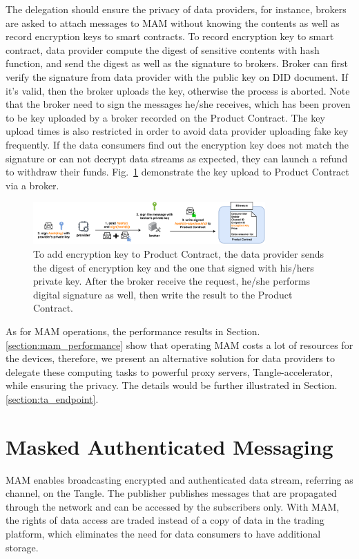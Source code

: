 \documentclass[conference]{IEEEtran}
\begin{document}
The delegation should ensure the privacy of data providers, for instance, brokers are asked to attach messages to MAM without knowing the contents as well as record encryption keys to smart contracts. To record encryption key to smart contract, data provider compute the digest of sensitive contents with hash function, and send the digest as well as the signature to brokers. Broker can first verify the signature from data provider with the public key on DID document. If it's valid, then the broker uploads the key, otherwise the process is aborted. Note that the broker need to sign the messages he/she receives, which has been proven to be key uploaded by a broker recorded on the Product Contract. The key upload times is also restricted in order to avoid data provider uploading fake key frequently. If the data consumers find out the encryption key does not match the signature or can not decrypt data streams as expected, they can launch a refund to withdraw their funds. Fig.~\ref{fig:key_upload} demonstrate the key upload to Product Contract via a broker. 

\begin{figure}[h]
    \centering
    \includegraphics[width=3.5in]{key_upload}
    \caption{To add encryption key to Product Contract, the data provider sends the digest of encryption key and the one that signed with his/hers private key. After the broker receive the request, he/she performs digital signature as well, then write the result to the Product Contract.}
    \label{fig:key_upload}
\end{figure}

As for MAM operations, the performance results in Section.\ref{section:mam_performance} show that operating MAM costs a lot of resources for the devices, therefore, we present an alternative solution for data providers to delegate these computing tasks to powerful proxy servers, Tangle-accelerator\cite{TA}, while ensuring the privacy. The details would be further illustrated in Section.\ref{section:ta_endpoint}. 

\section{Masked Authenticated Messaging}
MAM enables broadcasting encrypted and authenticated data stream, referring as channel, on the Tangle. The publisher publishes messages that are propagated through the network and can be accessed by the subscribers only. With MAM, the rights of data access are traded instead of a copy of data in the trading platform, which eliminates the need for data consumers to have additional storage. 
\end{document}
